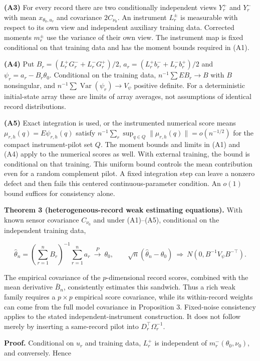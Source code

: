 \documentclass[
  american,
  11pt,
]{article}
\begin{document}
\textbf{(A3)} For every record there are two conditionally independent
views \(Y_r^+\) and \(Y_r^-\) with mean \(x_{\theta_0,u_r}\) and
covariance \(2C_{\nu_0}\). An instrument \(L_r^\pm\) is measurable with
respect to its own view and independent auxiliary training data.
Corrected moments \(m_r^\pm\) use the variance of their own view. The
instrument map is fixed conditional on that training data and has the
moment bounds required in (A1).

\textbf{(A4)} Put \(B_r=(L_r^+G_r^-+L_r^-G_r^+)/2\),
\(a_r=(L_r^+b_r^-+L_r^-b_r^+)/2\) and \(\psi_r=a_r-B_r\theta_0\).
Conditional on the training data, \(n^{-1}\sum E B_r\to B\) with \(B\)
nonsingular, and \(n^{-1}\sum\operatorname{Var}(\psi_r)\to V_\psi\)
positive definite. For a deterministic initial-state array these are
limits of array averages, not assumptions of identical record
distributions.

\textbf{(A5)} Exact integration is used, or the instrumented numerical
score means \(\mu_{r,h}(q)=E\psi_{r,h}(q)\) satisfy
\(n^{-1}\sum_r\sup_{q\in Q}\|\mu_{r,h}(q)\|=o(n^{-1/2})\) for the
compact instrument-pilot set \(Q\). The moment bounds and limits in (A1)
and (A4) apply to the numerical scores as well. With external training,
the bound is conditional on that training. This uniform bound controls
the mean contribution even for a random complement pilot. A fixed
integration step can leave a nonzero defect and then fails this centered
continuous-parameter condition. An \(o(1)\) bound suffices for
consistency alone.

\textbf{Theorem 3 (heterogeneous-record weak estimating equations).}
With known sensor covariance \(C_{\nu_0}\) and under (A1)--(A5),
conditional on the independent training data,

\[
\widehat\theta_n=\left(\sum_{r=1}^n B_r\right)^{-1}\sum_{r=1}^n a_r
\ \xrightarrow{P}\ \theta_0,
\qquad
\sqrt n(\widehat\theta_n-\theta_0)
\ \Rightarrow\ N(0,B^{-1}V_\psi B^{-\top}).
\]

The empirical covariance of the \(p\)-dimensional record scores,
combined with the mean derivative \(\bar B_n\), consistently estimates
this sandwich. Thus a rich weak family requires a \(p\times p\)
empirical score covariance, while its within-record weights can come
from the full model covariance in Proposition 3. Fixed-noise consistency
applies to the stated independent-instrument construction. It does not
follow merely by inserting a same-record pilot into
\(D_r^\top\Omega_r^{-1}\).

\textbf{Proof.} Conditional on \(u_r\) and training data, \(L_r^+\) is
independent of \(m_r^-(\theta_0,\nu_0)\), and conversely. Hence
\end{document}

